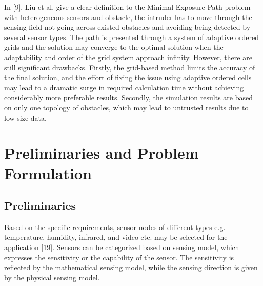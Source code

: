\documentclass[final]{elsarticle}
\begin{document}
In [9], Liu et al. give a clear definition to the Minimal Exposure Path problem with heterogeneous sensors and obstacle, the intruder has to move through the sensing field not going across existed obstacles and avoiding being detected by several sensor types. The path is presented through a system of adaptive ordered grids and the solution may converge to the optimal solution when the adaptability and order of the grid system approach infinity. However, there are still significant drawbacks. Firstly, the grid-based method limits the accuracy of the final solution, and the effort of fixing the issue using adaptive ordered cells may lead to a dramatic surge in required calculation time without achieving considerably more preferable results. Secondly, the simulation results are based on only one topology of obstacles, which may lead to untrusted results due to low-size data.

\section{Preliminaries and Problem Formulation}

\subsection{Preliminaries}
	
Based on the specific requirements, sensor nodes of different types e.g. temperature, humidity, infrared, and video etc. may be selected for the application [19]. Sensors can be categorized based on sensing model, which expresses the sensitivity or the capability of the sensor. The sensitivity is reflected by the mathematical sensing model, while the sensing direction is given by the physical sensing model.
\end{document}
